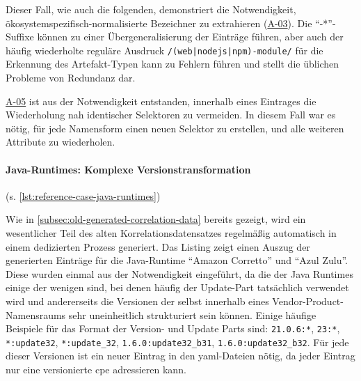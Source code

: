 Dieser Fall, wie auch die folgenden, demonstriert die Notwendigkeit, ökosystemspezifisch-normalisierte Bezeichner zu extrahieren (\hyperref[subsec:req-type-specific-matching]{A-03}).
Die \enquote{-*}-Suffixe können zu einer Übergeneralisierung der Einträge führen, aber auch der häufig wiederholte reguläre Ausdruck \texttt{/(web|nodejs|npm)-module/} für die Erkennung des Artefakt-Typen kann zu Fehlern führen und stellt die üblichen Probleme von Redundanz dar.

\hyperref[subsec:req-multiple-attribute-values]{A-05} ist aus der Notwendigkeit entstanden, innerhalb eines Eintrages die Wiederholung nah identischer Selektoren zu vermeiden.
In diesem Fall war es nötig, für jede Namensform einen neuen Selektor zu erstellen, und alle weiteren Attribute zu wiederholen.

\paragraph{Java-Runtimes: Komplexe Versionstransformation}\label{par:reference-case-java-runtimes} (s. \autoref{lst:reference-case-java-runtimes})

Wie in \autoref{subsec:old-generated-correlation-data} bereits gezeigt, wird ein wesentlicher Teil des alten Korrelationsdatensatzes regelmäßig automatisch in einem dedizierten Prozess generiert.
Das Listing zeigt einen Auszug der generierten Einträge für die Java-Runtime \enquote{Amazon Corretto} und \enquote{Azul Zulu}.
Diese wurden einmal aus der Notwendigkeit eingeführt, da die  der Java Runtimes einige der wenigen sind, bei denen häufig der Update-Part tatsächlich verwendet wird und andererseits die Versionen der  selbst innerhalb eines Vendor-Product-Namensraums sehr uneinheitlich strukturiert sein können.
Einige häufige Beispiele für das Format der Version- und Update Parts sind: \texttt{21.0.6:*}, \texttt{23:*}, \texttt{*:update32}, \texttt{*:update\_32}, \texttt{1.6.0:update32\_b31}, \texttt{1.6.0:update32\_b32}.
Für jede dieser Versionen ist ein neuer Eintrag in den \acrshort{yaml}-Dateien nötig, da jeder Eintrag nur eine versionierte \acrshort{cpe} adressieren kann.

